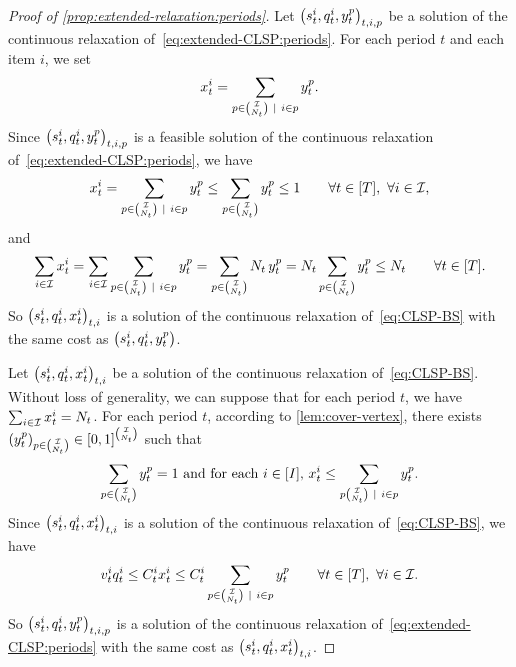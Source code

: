 \begin{proof}[Proof of \cref{prop:extended-relaxation:periods}]
Let $\bracket{\inventory_t^i, \quantity_t^i, y_t^p}_{t,i,p}$ be a solution of the continuous relaxation of~\eqref{eq:extended-CLSP:periods}.
For each period $t$ and each item $i$, we set
\begin{equation}
  x_t^i=\sum_{p\in{\mathcal{I}\choose N_t}~|~i\in p} y_t^p.
\end{equation}
Since $\bracket{\inventory_t^i, \quantity_t^i, y_t^p}_{t,i,p}$ is a feasible solution of the continuous relaxation of~\eqref{eq:extended-CLSP:periods}, we have
\begin{equation}
\setup_t^i
= \sum_{p\in{\REF\choose\nbsetups_t}~|~i\in p} y_t^p
\le \sum_{p\in{\REF\choose\nbsetups_t}} y_t^p
\le 1
\qquad \forall t\in\range{\horizon},\ \forall i\in\REF,
\end{equation}
and
\begin{equation}
\sum_{i\in\REF}\setup_t^i
= \sum_{i\in\REF}\sum_{p\in{\REF\choose\nbsetups_t}~|~i\in p} y_t^p
= \sum_{p\in{\REF\choose\nbsetups_t}} \nbsetups_t\, y_t^p
= \nbsetups_t \sum_{p\in{\REF\choose\nbsetups_t}} y_t^p
\le \nbsetups_t
\qquad \forall t\in\range{\horizon}.
\end{equation}
So $\bracket{\inventory_t^i, \quantity_t^i, \setup_t^i}_{t,i}$  is a solution of the continuous relaxation of~\eqref{eq:CLSP-BS} with the same cost as $\bracket{\inventory_t^i, \quantity_t^i, y_t^p}$.


Let $\bracket{\inventory_t^i, \quantity_t^i, \setup_t^i}_{t,i}$ be a solution of the continuous relaxation of~\eqref{eq:CLSP-BS}.
Without loss of generality, we can suppose that for each period $t$, we have $\sum_{i\in\mathcal{I}}x_t^i=N_t$.
For each period $t$, according to \cref{lem:cover-vertex}, there exists
$\bracket{y_t^p}_{p\in{\REF\choose\nbsetups_t}}\in\sqbracket{0,1}^{\REF\choose\nbsetups_t}$ such that
\begin{equation}
  \sum_{p\in{\REF\choose\nbsetups_t}}y_t^p = 1
  \ \mbox{and for each $i\in\range{I}$,}\ 
  \setup_t^i \le \sum_{p{\REF\choose\nbsetups_t}~|~i\in p} y_t^p.
\end{equation}
Since $\bracket{\inventory_t^i, \quantity_t^i, \setup_t^i}_{t,i}$ is a solution of the continuous relaxation of~\eqref{eq:CLSP-BS}, we have
\begin{equation}
\rate_t^i\quantity_t^i
\le \capacity_t^i\setup_t^i
\le \capacity_t^i\sum_{p\in{\REF\choose\nbsetups_t}~|~i\in p} y_t^p
\qquad \forall t\in\range{\horizon},\ \forall i\in\REF.
\end{equation}
So $\bracket{\inventory_t^i, \quantity_t^i, y_t^p}_{t,i,p}$ is a solution of the continuous relaxation of~\eqref{eq:extended-CLSP:periods} with the same cost as $\bracket{\inventory_t^i, \quantity_t^i, \setup_t^i}_{t,i}$.
\end{proof}



